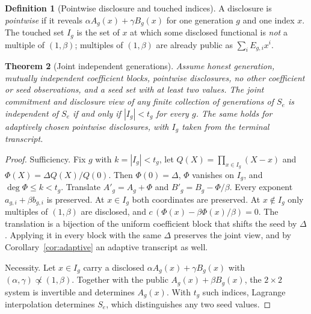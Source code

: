 \documentclass[pdflatex,sn-mathphys-num]{sn-jnl}%
\theoremstyle{plain}
\newtheorem{theorem}{Theorem}
\theoremstyle{definition}
\newtheorem{definition}[theorem]{Definition}
\begin{document}
\begin{definition}[Pointwise disclosure and touched indices]
A disclosure is \emph{pointwise} if it reveals $\alpha A_g(x)+\gamma B_g(x)$ for one generation $g$ and one index $x$. The touched set $I_g$ is the set of $x$ at which some disclosed functional is \emph{not} a multiple of $(1,\beta)$; multiples of $(1,\beta)$ are already public as $\sum_iE_{g,i}x^i$.
\end{definition}

\begin{keyresult}
\begin{theorem}[Joint independent generations]\label{thm:generations}
Assume honest generation, mutually independent coefficient blocks, pointwise disclosures, no other coefficient or seed observations, and a seed set with at least two values. The joint commitment and disclosure view of any finite collection of generations of $S_e$ is independent of $S_e$ if and only if $|I_g|<t_g$ for every $g$. The same holds for adaptively chosen pointwise disclosures, with $I_g$ taken from the terminal transcript.
\end{theorem}
\end{keyresult}
\begin{proof}
Sufficiency. Fix $g$ with $k=|I_g|<t_g$, let $Q(X)=\prod_{x\in I_g}(X-x)$ and $\Phi(X)=\Delta Q(X)/Q(0)$. Then $\Phi(0)=\Delta$, $\Phi$ vanishes on $I_g$, and $\deg\Phi\le k<t_g$. Translate $A'_g=A_g+\Phi$ and $B'_g=B_g-\Phi/\beta$. Every exponent $a_{g,i}+\beta b_{g,i}$ is preserved. At $x\in I_g$ both coordinates are preserved. At $x\notin I_g$ only multiples of $(1,\beta)$ are disclosed, and $c\,(\Phi(x)-\beta\Phi(x)/\beta)=0$. The translation is a bijection of the uniform coefficient block that shifts the seed by $\Delta$. Applying it in every block with the same $\Delta$ preserves the joint view, and by Corollary~\ref{cor:adaptive} an adaptive transcript as well.

Necessity. Let $x\in I_g$ carry a disclosed $\alpha A_g(x)+\gamma B_g(x)$ with $(\alpha,\gamma)\not\propto(1,\beta)$. Together with the public $A_g(x)+\beta B_g(x)$, the $2\times2$ system is invertible and determines $A_g(x)$. With $t_g$ such indices, Lagrange interpolation determines $S_e$, which distinguishes any two seed values.
\end{proof}
\end{document}
